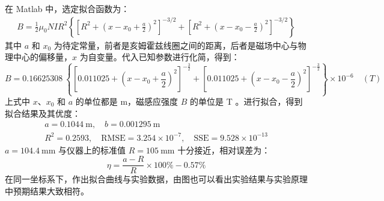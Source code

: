 \documentclass[UTF8]{article}
\theoremstyle{MyLineTheoremStyle} %
\theoremstyle{MyBlockTheoremStyle} %
\theoremstyle{MySubsubsectionStyle} %
\begin{document}
\begin{table}[H]\centering
    \caption{亥姆霍兹线圈轴线上的磁场分布}
    \label{亥姆霍兹线圈轴线上的磁场分布}
\end{table}
在 Matlab 中，选定拟合函数为：
\begin{gather}
    B=\frac12\mu_0NIR^2\left\{\left[R^2+\left(x - x_0 + \frac{a}{2}\right)^2\right]^{-3/2}+\left[R^2+\left(x - x_0 - \frac{a}{2}\right)^2\right]^{-3/2}\right\}
\end{gather}
其中 $a$ 和 $x_0$ 为待定常量，前者是亥姆霍兹线圈之间的距离，后者是磁场中心与物理中心的偏移量，$x$ 为自变量。代入已知参数进行化简，得到：
\begin{equation}
B = 0.16625308\ \left\{ \left[ 0.011025 + \left(x - x_0 + \frac{a}{2}\right)^2\right]^{-\frac{3}{2}} + \left[ 0.011025 + \left(x - x_0 - \frac{a}{2}\right)^2\right]^{-\frac{3}{2}} \right\} \times 10^{-6}\quad (T)
\end{equation}
上式中 $x$、$x_0$ 和 $a$ 的单位都是 m，磁感应强度 $B$ 的单位是 T 。进行拟合，得到拟合结果及其优度：
\begin{gather}
a = 0.1044 \ \mathrm{m},\quad b = 0.001295 \ \mathrm{m} \\ 
R^2 = 0.2593,\quad \text{RMSE} = 3.254\times 10^{-7},\quad \text{SSE} = 9.528\times 10^{-13}
\end{gather}
$a = 104.4 \ \mathrm{mm}$ 与仪器上的标准值 $R = 105 \ \mathrm{mm}$ 十分接近，相对误差为：
\begin{equation}
\eta = \frac{a - R}{R} \times 100 \%  -0.57\%
\end{equation}
在同一坐标系下，作出拟合曲线与实验数据，由图也可以看出实验结果与实验原理中预期结果大致相符。
\end{document}
